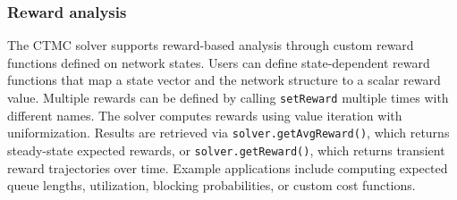 
\subsubsection{Reward analysis}

The CTMC solver supports reward-based analysis through custom reward functions defined on network states. Users can define state-dependent reward functions that map a state vector and the network structure to a scalar reward value. Multiple rewards can be defined by calling \texttt{setReward} multiple times with different names. The solver computes rewards using value iteration with uniformization. Results are retrieved via \texttt{solver.getAvgReward()}, which returns steady-state expected rewards, or \texttt{solver.getReward()}, which returns transient reward trajectories over time. Example applications include computing expected queue lengths, utilization, blocking probabilities, or custom cost functions.

